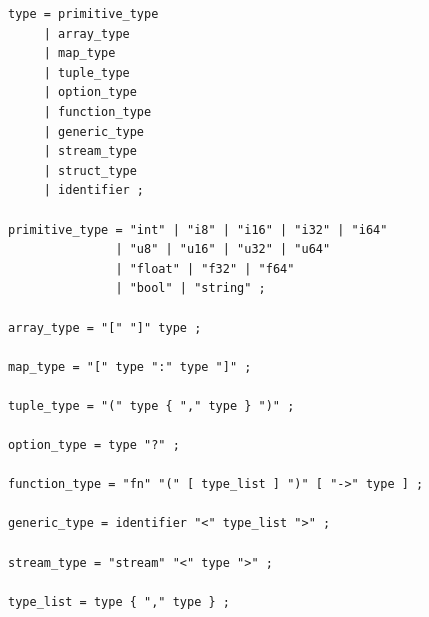 \begin{lstlisting}[language=EBNF]
type = primitive_type
     | array_type
     | map_type
     | tuple_type
     | option_type
     | function_type
     | generic_type
     | stream_type
     | struct_type
     | identifier ;

primitive_type = "int" | "i8" | "i16" | "i32" | "i64"
               | "u8" | "u16" | "u32" | "u64"
               | "float" | "f32" | "f64"
               | "bool" | "string" ;

array_type = "[" "]" type ;

map_type = "[" type ":" type "]" ;

tuple_type = "(" type { "," type } ")" ;

option_type = type "?" ;

function_type = "fn" "(" [ type_list ] ")" [ "->" type ] ;

generic_type = identifier "<" type_list ">" ;

stream_type = "stream" "<" type ">" ;

type_list = type { "," type } ;
\end{lstlisting}
